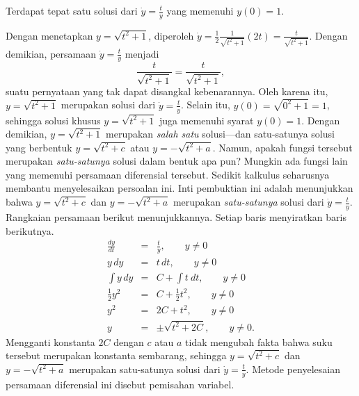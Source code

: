 \noindent\begin{digression}{Terdapat tepat satu solusi dari $\dot y=\frac{t}{y}$ yang memenuhi $y(0)=1$.}

\noindent Dengan menetapkan $y=\sqrt{t^{2}+1}$, diperoleh $\dot{y}=\frac{1}{2}\frac{1}{\sqrt{t^{2}+1}}(2t)=\frac{t}{\sqrt{t^{2}+1}}$.
Dengan demikian, persamaan $\dot{y}=\frac{t}{y}$ menjadi
\[
\frac{t}{\sqrt{t^{2}+1}}=\frac{t}{\sqrt{t^{2}+1}},
\]
suatu pernyataan yang tak dapat disangkal kebenarannya. Oleh karena
itu, $y=\sqrt{t^{2}+1}$ merupakan solusi dari $\dot{y}=\frac{t}{y}$.
Selain itu, $y(0)=\sqrt{0^{2}+1}=1$, sehingga solusi khusus $y=\sqrt{t^{2}+1}$
juga memenuhi syarat $y(0)=1$. Dengan demikian, $y=\sqrt{t^{2}+1}$
merupakan \textit{salah satu} solusi---dan satu-satunya solusi yang
berbentuk $y=\sqrt{t^{2}+c}$ atau $y=-\sqrt{t^{2}+a}$. Namun, apakah
fungsi tersebut merupakan \textit{satu-satunya} solusi dalam bentuk
apa pun? Mungkin ada fungsi lain yang memenuhi persamaan diferensial
tersebut. Sedikit kalkulus seharusnya membantu menyelesaikan persoalan
ini. Inti pembuktian ini adalah menunjukkan bahwa $y=\sqrt{t^{2}+c}$
dan $y=-\sqrt{t^{2}+a}$ merupakan \textit{satu-satunya} solusi dari
$\dot{y}=\frac{t}{y}$. Rangkaian persamaan berikut menunjukkannya.
Setiap baris menyiratkan baris berikutnya. 
\begin{eqnarray*}
\frac{dy}{dt} & = & \frac{t}{y},\qquad y\neq0\\
y\,dy & = & t\,dt,\qquad y\neq0\\
\int y\,dy & = & C+\int t\:dt,\qquad y\neq0\\
\frac{1}{2}y^{2} & = & C+\frac{1}{2}t^{2},\qquad y\neq0\\
y^{2} & = & 2C+t^{2},\qquad y\neq0\\
y & = & \pm\sqrt{t^{2}+2C},\qquad y\neq0.
\end{eqnarray*}
Mengganti konstanta $2C$ dengan $c$ atau $a$ tidak mengubah fakta
bahwa suku tersebut merupakan konstanta sembarang, sehingga $y=\sqrt{t^{2}+c}$
dan $y=-\sqrt{t^{2}+a}$ merupakan satu-satunya solusi dari $\dot{y}=\frac{t}{y}$.
Metode penyelesaian persamaan diferensial ini disebut pemisahan variabel.

\noindent\end{digression}

